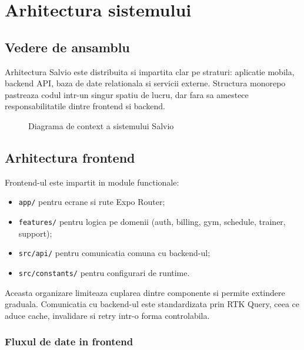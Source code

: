 \chapter{Arhitectura sistemului}

\section{Vedere de ansamblu}

Arhitectura Salvio este distribuita si impartita clar pe straturi: aplicatie mobila, backend API, baza de date relationala si servicii externe. Structura monorepo pastreaza codul intr-un singur spatiu de lucru, dar fara sa amestece responsabilitatile dintre frontend si backend.

\begin{figure}[H]
\centering
{}
\caption{Diagrama de context a sistemului Salvio}
\end{figure}

\section{Arhitectura frontend}

Frontend-ul este impartit in module functionale:
\begin{itemize}[leftmargin=1.2cm]
    \item \texttt{app/} pentru ecrane si rute Expo Router;
    \item \texttt{features/} pentru logica pe domenii (auth, billing, gym, schedule, trainer, support);
    \item \texttt{src/api/} pentru comunicatia comuna cu backend-ul;
    \item \texttt{src/constants/} pentru configurari de runtime.
\end{itemize}

Aceasta organizare limiteaza cuplarea dintre componente si permite extindere graduala. Comunicatia cu backend-ul este standardizata prin RTK Query, ceea ce aduce cache, invalidare si retry intr-o forma controlabila.

\subsection{Fluxul de date in frontend}

